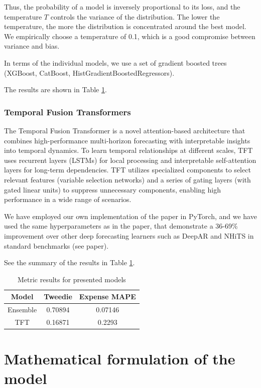 \documentclass[11pt,twocolumn]{article}
\begin{document}
Thus, the probability of a model is inversely proportional to its loss, and the temperature $T$ controls the variance of the distribution. The lower the temperature, the more the distribution is concentrated around the best model. We empirically choose a temperature of 0.1, which is a good compromise between variance and bias.

In terms of the individual models, we use a set of gradient boosted trees (XGBoost, CatBoost, HistGradientBoostedRegressors).

The results are shown in Table \ref{tab:enter-label}.

\subsubsection{Temporal Fusion Transformers}
The Temporal Fusion Transformer \cite{key4} is a novel attention-based architecture that combines high-performance multi-horizon forecasting with interpretable insights into temporal dynamics. To learn temporal relationships at different scales, TFT uses recurrent layers (LSTMs) for local processing and interpretable self-attention layers for long-term dependencies. TFT utilizes specialized components to select relevant features (variable selection networks) and a series of gating layers (with gated linear units) to suppress unnecessary components, enabling high performance in a wide range of scenarios.

We have employed our own implementation of the paper in PyTorch, and we have used the same hyperparameters as in the paper, that demonstrate a 36-69\% improvement over other deep forecasting learners such as DeepAR and NHiTS in standard benchmarks (see paper).

See the summary of the results in Table \ref{tab:enter-label}.

\begin{table}[h]
	\centering
	\begin{tabular}{|c|c|c|}
		\hline
		Model    & Tweedie & Expense MAPE \\
		\hline
		Ensemble & 0.70894 & 0.07146      \\
		\hline
		TFT      & 0.16871 & 0.2293       \\
		\hline
	\end{tabular}

	\caption{Metric results for presented models}
	\label{tab:enter-label}
\end{table}

\section{Mathematical formulation of the model}
\end{document}
